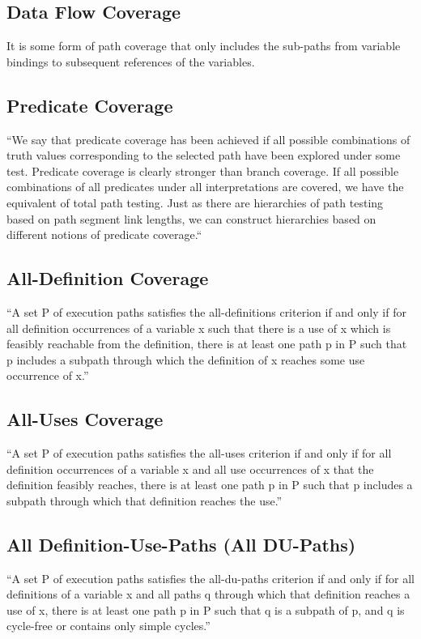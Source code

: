 \documentclass[12pt,a4paper]{report}
\begin{document}
\subsection{Data Flow Coverage}
It is some form of path coverage that only includes the sub-paths from variable bindings to subsequent references of the variables.
 
\subsection{Predicate Coverage}
“We say that predicate coverage has been achieved if all possible combinations of truth values corresponding to the selected path have been explored under
 some test. Predicate coverage is clearly stronger than branch coverage. If all possible combinations of all predicates under all interpretations are
 covered, we have the equivalent of total path testing. Just as there are hierarchies of path testing based on path segment link lengths, we can construct
 hierarchies based on different notions of predicate coverage.“\cite{beizer2002software}

\subsection{All-Definition Coverage}
“A set P of execution paths satisfies the all-definitions criterion if and only if for all definition occurrences of a variable x such that there is a use
 of x which is feasibly reachable from the definition, there is at least one path p in P such that p includes a subpath through which the definition of x
 reaches some use occurrence of x.”\cite{Zhu:1997:SUT:267580.267590}

\subsection{All-Uses Coverage}
“A set P of execution paths satisfies the all-uses criterion if and only if for all definition occurrences of a variable x and all use occurrences of x that
 the definition feasibly reaches, there is at least one path p in P such that p includes a subpath through which that definition reaches the use.”
\cite{Zhu:1997:SUT:267580.267590}

\subsection{All Definition-Use-Paths (All DU-Paths)}
“A set P of execution paths satisfies the all-du-paths criterion if and only if for all definitions of a variable x and all paths q through which that
 definition reaches a use of x, there is at least one path p in P such that q is a subpath of p, and q is cycle-free or contains only simple cycles.”
\cite{Zhu:1997:SUT:267580.267590}
\end{document}
